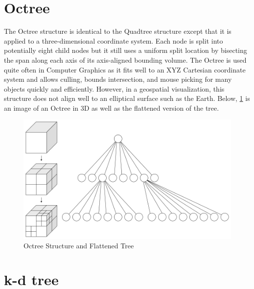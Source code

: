 \section{Octree}

The Octree structure is identical to the Quadtree structure except that it is
applied to a three-dimensional coordinate system. Each node is split into
potentially eight child nodes but it still uses a uniform split location by
bisecting the span along each axis of its axis-aligned bounding volume. The
Octree is used quite often in Computer Graphics as it fits well to an XYZ
Cartesian coordinate system and allows culling, bounds intersection, and mouse
picking for many objects quickly and efficiently. However, in a geospatial
visualization, this structure does not align well to an elliptical surface such
as the Earth. Below, \ref{fig:octree} is an image of an Octree in 3D as well as the
flattened version of the tree.

\begin{figure}[htb]
\begin{center}
\includegraphics[width=.9\linewidth]{images/Octree_flat.png}
\end{center}
\caption{Octree Structure and Flattened Tree {\cite{11_octree2}}}
\label{fig:octree}
\end{figure}

\section{k-d tree}

